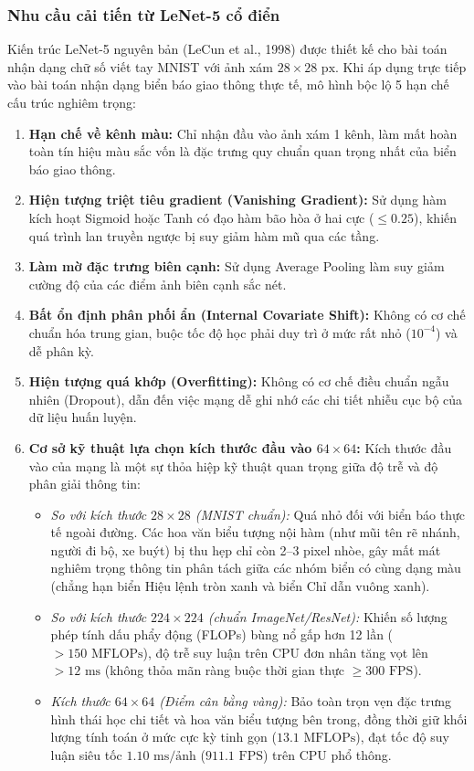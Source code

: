 \documentclass[a4paper, 11pt]{article}
\begin{document}
\subsubsection{Nhu cầu cải tiến từ LeNet-5 cổ điển}
\label{subsubsec:lenet_cai_tien}

Kiến trúc LeNet-5 nguyên bản (LeCun et al., 1998) được thiết kế cho bài toán nhận dạng chữ số viết tay MNIST với ảnh xám $28 \times 28\text{ px}$. Khi áp dụng trực tiếp vào bài toán nhận dạng biển báo giao thông thực tế, mô hình bộc lộ 5 hạn chế cấu trúc nghiêm trọng:

\begin{enumerate}
    \item \textbf{Hạn chế về kênh màu:} Chỉ nhận đầu vào ảnh xám 1 kênh, làm mất hoàn toàn tín hiệu màu sắc vốn là đặc trưng quy chuẩn quan trọng nhất của biển báo giao thông.
    \item \textbf{Hiện tượng triệt tiêu gradient (Vanishing Gradient):} Sử dụng hàm kích hoạt Sigmoid hoặc Tanh có đạo hàm bão hòa ở hai cực ($\le 0.25$), khiến quá trình lan truyền ngược bị suy giảm hàm mũ qua các tầng.
    \item \textbf{Làm mờ đặc trưng biên cạnh:} Sử dụng Average Pooling làm suy giảm cường độ của các điểm ảnh biên cạnh sắc nét.
    \item \textbf{Bất ổn định phân phối ẩn (Internal Covariate Shift):} Không có cơ chế chuẩn hóa trung gian, buộc tốc độ học phải duy trì ở mức rất nhỏ ($10^{-4}$) và dễ phân kỳ.
    \item \textbf{Hiện tượng quá khớp (Overfitting):} Không có cơ chế điều chuẩn ngẫu nhiên (Dropout), dẫn đến việc mạng dễ ghi nhớ các chi tiết nhiễu cục bộ của dữ liệu huấn luyện.
    \item \textbf{Cơ sở kỹ thuật lựa chọn kích thước đầu vào $64 \times 64$:} Kích thước đầu vào của mạng là một sự thỏa hiệp kỹ thuật quan trọng giữa độ trễ và độ phân giải thông tin:
    \begin{itemize}
        \item \textit{So với kích thước $28 \times 28$ (MNIST chuẩn):} Quá nhỏ đối với biển báo thực tế ngoài đường. Các hoa văn biểu tượng nội hàm (như mũi tên rẽ nhánh, người đi bộ, xe buýt) bị thu hẹp chỉ còn 2--3 pixel nhòe, gây mất mát nghiêm trọng thông tin phân tách giữa các nhóm biển có cùng dạng màu (chẳng hạn biển Hiệu lệnh tròn xanh và biển Chỉ dẫn vuông xanh).
        \item \textit{So với kích thước $224 \times 224$ (chuẩn ImageNet/ResNet):} Khiến số lượng phép tính dấu phẩy động (FLOPs) bùng nổ gấp hơn 12 lần ($> 150\text{ MFLOPs}$), độ trễ suy luận trên CPU đơn nhân tăng vọt lên $> 12\text{ ms}$ (không thỏa mãn ràng buộc thời gian thực $\ge 300\text{ FPS}$).
        \item \textit{Kích thước $64 \times 64$ (Điểm cân bằng vàng):} Bảo toàn trọn vẹn đặc trưng hình thái học chi tiết và hoa văn biểu tượng bên trong, đồng thời giữ khối lượng tính toán ở mức cực kỳ tinh gọn ($13.1\text{ MFLOPs}$), đạt tốc độ suy luận siêu tốc $1.10\text{ ms/ảnh}$ ($911.1\text{ FPS}$) trên CPU phổ thông.
    \end{itemize}
\end{enumerate}
\end{document}
